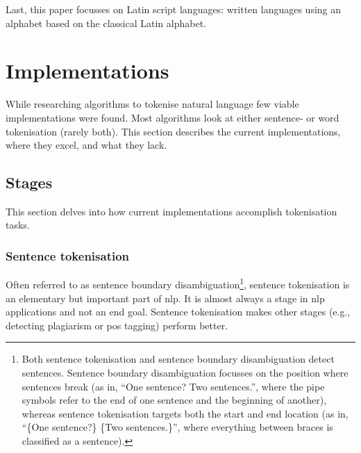Last, this paper focusses on Latin script languages: written languages
  using an alphabet based on the classical Latin alphabet.

\section{Implementations}\label{implementations}

While researching algorithms to tokenise natural language few viable
  implementations were found.
Most algorithms look at either sentence- or word tokenisation (rarely both).
This section describes the current implementations, where they excel, and
  what they lack.

\subsection{Stages}\label{stages}

This section delves into how current implementations accomplish
  tokenisation tasks.

\subsubsection{Sentence tokenisation}\label{sentence-tokenisation}

Often referred to as sentence boundary disambiguation\footnote{Both
    sentence tokenisation and sentence boundary disambiguation detect
      sentences.
    Sentence boundary disambiguation focusses on the position where
      sentences break (as in, ``One sentence?\textbar{} Two
      sentences.\textbar{}'', where the pipe symbols refer to the end of
      one sentence and the beginning of another), whereas sentence
      tokenisation targets both the start and end location (as in,
      ``\{One sentence?\} \{Two sentences.\}'', where everything between
      braces is classified as a sentence).}, sentence
  tokenisation is an elementary but important part of \gls{nlp}.
It is almost always a stage in \gls{nlp} applications and not an end goal.
Sentence tokenisation makes other stages (e.g., detecting plagiarism or
  \gls{pos} tagging) perform better.

